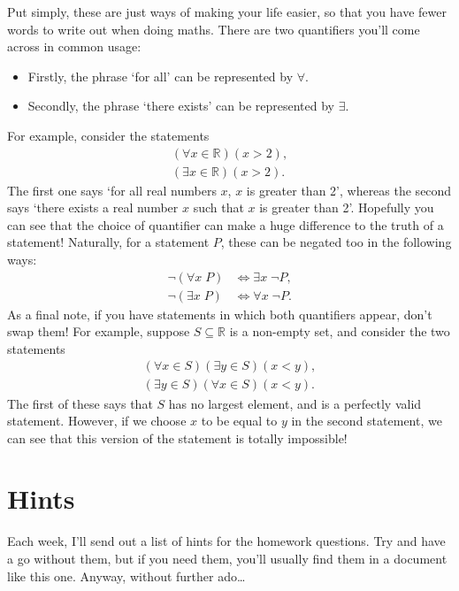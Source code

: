 \documentclass[
  10pt,
  a4paper]{article}
\providecommand{\tightlist}{%
  \setlength{\itemsep}{0pt}\setlength{\parskip}{0pt}}
\theoremstyle{plain}
\theoremstyle{definition}
\theoremstyle{plain}
\theoremstyle{plain}
\theoremstyle{plain}
\theoremstyle{plain}
\theoremstyle{definition}
\theoremstyle{definition}
\newtheorem*{Order Axioms*}{Order Axioms}\newtheorem{Order Axioms}{Order Axioms}[section]
\theoremstyle{remark}
\theoremstyle{remark}
\begin{document}
Put simply, these are just ways of making your life easier, so that you have fewer words to write out when doing maths. There are two quantifiers you'll come across in common usage:

\begin{itemize}
\tightlist
\item
  Firstly, the phrase `for all' can be represented by \(\forall\).
\item
  Secondly, the phrase `there exists' can be represented by \(\exists\).
\end{itemize}

For example, consider the statements
\begin{align*}
    (\forall x \in \mathbb{R})(x > 2),\\
    (\exists x \in \mathbb{R})(x > 2).
\end{align*}
The first one says `for all real numbers \(x\), \(x\) is greater than 2', whereas the second says `there exists a real number \(x\) such that \(x\) is greater than 2'. Hopefully you can see that the choice of quantifier can make a huge difference to the truth of a statement! Naturally, for a statement \(P\), these can be negated too in the following ways:
\begin{align*}
    \neg(\forall x \; P) &\Leftrightarrow \exists x \; \neg P,\\
    \neg(\exists x \; P) &\Leftrightarrow \forall x\;  \neg P.
\end{align*}
As a final note, if you have statements in which both quantifiers appear, don't swap them! For example, suppose \(S \subseteq \mathbb{R}\) is a non-empty set, and consider the two statements
\begin{align*}
    (\forall x \in S)(\exists y \in S)(x < y),\\
    (\exists y \in S)(\forall x \in S)(x < y).
\end{align*}
The first of these says that \(S\) has no largest element, and is a perfectly valid statement. However, if we choose \(x\) to be equal to \(y\) in the second statement, we can see that this version of the statement is totally impossible!

\hypertarget{hints}{%
\section{Hints}\label{hints}}

Each week, I'll send out a list of hints for the homework questions. Try and have a go without them, but if you need them, you'll usually find them in a document like this one. Anyway, without further ado\ldots{}
\end{document}
